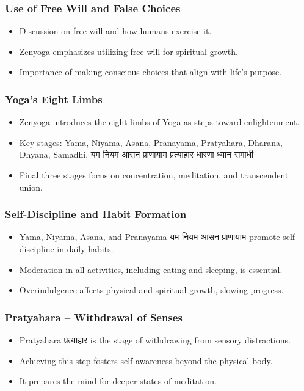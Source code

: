\begin{frame}[fragile]\frametitle{Use of Free Will and False Choices}
    \begin{itemize}
        \item Discussion on free will and how humans exercise it.
        \item Zenyoga emphasizes utilizing free will for spiritual growth.
        \item Importance of making conscious choices that align with life's purpose.
    \end{itemize}
\end{frame}

\begin{frame}[fragile]\frametitle{Yoga's Eight Limbs}
    \begin{itemize}
        \item Zenyoga introduces the eight limbs of Yoga as steps toward enlightenment.
        \item Key stages: Yama, Niyama, Asana, Pranayama, Pratyahara, Dharana, Dhyana, Samadhi. यम नियम आसन प्राणायाम प्रत्याहार धारणा ध्यान समाधी 
        \item Final three stages focus on concentration, meditation, and transcendent union.
    \end{itemize}
\end{frame}

\begin{frame}[fragile]\frametitle{Self-Discipline and Habit Formation}
    \begin{itemize}
        \item Yama, Niyama, Asana, and Pranayama यम नियम आसन प्राणायाम promote self-discipline in daily habits.
        \item Moderation in all activities, including eating and sleeping, is essential.
        \item Overindulgence affects physical and spiritual growth, slowing progress.
    \end{itemize}
\end{frame}

\begin{frame}[fragile]\frametitle{Pratyahara – Withdrawal of Senses}
    \begin{itemize}
        \item Pratyahara प्रत्याहार is the stage of withdrawing from sensory distractions.
        \item Achieving this step fosters self-awareness beyond the physical body.
        \item It prepares the mind for deeper states of meditation.
    \end{itemize}
\end{frame}

